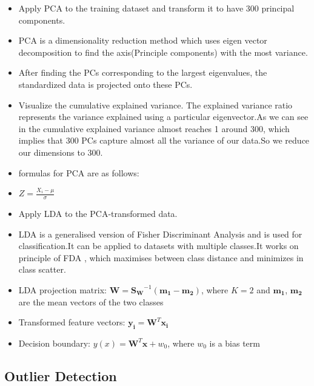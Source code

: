 \documentclass{article}
\begin{document}
\begin{itemize}
    \item Apply PCA to the training dataset and transform it to have 300 principal components.
    \item PCA is a dimensionality reduction method which uses eigen vector decomposition to find the axis(Principle components) with the most variance.
    \item After finding the PCs corresponding to the largest eigenvalues, the standardized data is projected onto these PCs.
    \item Visualize the cumulative explained variance. The explained variance ratio represents the variance explained using a particular eigenvector.As we can see in the cumulative explained variance almost reaches 1 around 300, which implies that 300 PCs capture almost all the variance of our data.So we reduce our dimensions to 300.
    \item formulas for PCA are as follows:
    \item $Z= \frac{X_i - \mu}{\sigma}$
    \item Apply LDA to the PCA-transformed data.
    \item LDA is a generalised version of Fisher Discriminant Analysis and is used for classification.It can be applied to datasets with multiple classes.It works on principle of FDA , which maximises between class distance and minimizes in class scatter.
    \item LDA projection matrix: $\boldsymbol{W} = \boldsymbol{S_W}^{-1} (\boldsymbol{m_1} - \boldsymbol{m_2})$, where $K=2$ and $\boldsymbol{m_1}$, $\boldsymbol{m_2}$ are the mean vectors of the two classes
    \item Transformed feature vectors: $\boldsymbol{y_i} = \boldsymbol{W}^T \boldsymbol{x_i}$
    \item Decision boundary: $y(x) = \boldsymbol{W}^T \boldsymbol{x} + w_0$, where $w_0$ is a bias term
\end{itemize}

\subsection{Outlier Detection}
\end{document}
